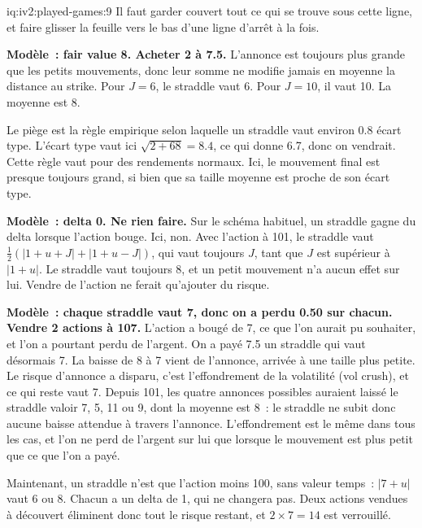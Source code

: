 \begin{solution}{iq:iv2:played-games:9}
Il faut garder couvert tout ce qui se trouve sous cette ligne, et faire glisser la feuille vers le bas d'une ligne d'arrêt à la fois.

\ivstop
\textbf{Modèle~: fair value 8. Acheter 2 à 7.5.} L'annonce est toujours plus grande que les petits mouvements, donc leur somme ne modifie jamais en moyenne la distance au strike. Pour $J = 6$, le straddle vaut 6. Pour $J = 10$, il vaut 10. La moyenne est 8.

Le piège est la règle empirique selon laquelle un straddle vaut environ 0.8 écart type. L'écart type vaut ici $\sqrt{2 + 68} = 8.4$, ce qui donne 6.7, donc on vendrait. Cette règle vaut pour des rendements normaux. Ici, le mouvement final est presque toujours grand, si bien que sa taille moyenne est proche de son écart type.

\ivstop
\textbf{Modèle~: delta 0. Ne rien faire.} Sur le schéma habituel, un straddle gagne du delta lorsque l'action bouge. Ici, non. Avec l'action à 101, le straddle vaut $\tfrac12(|1 + u + J| + |1 + u - J|)$, qui vaut toujours $J$, tant que $J$ est supérieur à $|1 + u|$. Le straddle vaut toujours 8, et un petit mouvement n'a aucun effet sur lui. Vendre de l'action ne ferait qu'ajouter du risque.

\ivstop
\textbf{Modèle~: chaque straddle vaut 7, donc on a perdu 0.50 sur chacun. Vendre 2 actions à 107.} L'action a bougé de 7, ce que l'on aurait pu souhaiter, et l'on a pourtant perdu de l'argent. On a payé 7.5 un straddle qui vaut désormais 7. La baisse de 8 à 7 vient de l'annonce, arrivée à une taille plus petite. Le risque d'annonce a disparu, c'est l'effondrement de la volatilité (vol crush), et ce qui reste vaut 7. Depuis 101, les quatre annonces possibles auraient laissé le straddle valoir 7, 5, 11 ou 9, dont la moyenne est 8~: le straddle ne subit donc aucune baisse attendue à travers l'annonce. L'effondrement est le même dans tous les cas, et l'on ne perd de l'argent sur lui que lorsque le mouvement est plus petit que ce que l'on a payé.

Maintenant, un straddle n'est que l'action moins 100, sans valeur temps~: $|7 + u|$ vaut 6 ou 8. Chacun a un delta de 1, qui ne changera pas. Deux actions vendues à découvert éliminent donc tout le risque restant, et $2 \times 7 = 14$ est verrouillé.


\end{solution}
